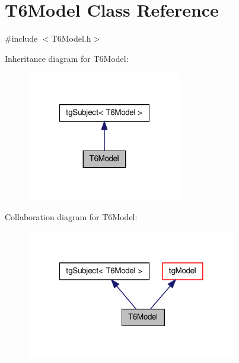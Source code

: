 \hypertarget{class_t6_model}{\section{T6\-Model Class Reference}
\label{class_t6_model}
}


{\ttfamily \#include $<$T6\-Model.\-h$>$}



Inheritance diagram for T6\-Model\-:\nopagebreak
\begin{figure}[H]
\begin{center}
\leavevmode
\includegraphics[width=192pt]{class_t6_model__inherit__graph}
\end{center}
\end{figure}


Collaboration diagram for T6\-Model\-:\nopagebreak
\begin{figure}[H]
\begin{center}
\leavevmode
\includegraphics[width=260pt]{class_t6_model__coll__graph}
\end{center}
\end{figure}
